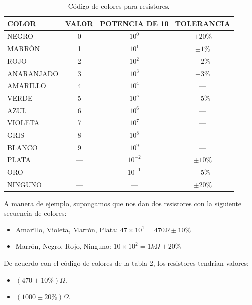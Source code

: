 \documentclass[12pt, a4paper]{article}
\begin{document}
\begin{table}[H]
    \centering
    \caption{Código de colores para resistores.}
    \begin{tabular}{|l|c|c|c|}
        \hline
        \textbf{COLOR} & \textbf{VALOR} & \textbf{POTENCIA DE 10} & \textbf{TOLERANCIA} \\
        \hline
        NEGRO & 0 & $10^0$ & $\pm 20\%$ \\
        \hline
        MARRÓN & 1 & $10^1$ & $\pm 1\%$ \\
        \hline
        ROJO & 2 & $10^2$ & $\pm 2\%$ \\
        \hline
        ANARANJADO & 3 & $10^3$ & $\pm 3\%$ \\
        \hline
        AMARILLO & 4 & $10^4$ & --- \\
        \hline
        VERDE & 5 & $10^5$ & $\pm 5\%$ \\
        \hline
        AZUL & 6 & $10^6$ & --- \\
        \hline
        VIOLETA & 7 & $10^7$ & --- \\
        \hline
        GRIS & 8 & $10^8$ & --- \\
        \hline
        BLANCO & 9 & $10^9$ & --- \\
        \hline
        PLATA & --- & $10^{-2}$ & $\pm 10\%$ \\
        \hline
        ORO & --- & $10^{-1}$ & $\pm 5\%$ \\
        \hline
        NINGUNO & --- & --- & $\pm 20\%$ \\
        \hline
    \end{tabular}
\end{table}

A manera de ejemplo, supongamos que nos dan dos resistores con la siguiente secuencia de colores:
\begin{itemize}
    \item[a.] Amarillo, Violeta, Marrón, Plata: $47 \times 10^1 = 470\Omega \pm 10\%$
    \item[b.] Marrón, Negro, Rojo, Ninguno: $10 \times 10^2 = 1k\Omega \pm 20\%$
\end{itemize}
De acuerdo con el código de colores de la tabla 2, los resistores tendrían valores:
\begin{itemize}
    \item[a.] $(470 \pm 10\%) \Omega$.
    \item[b.] $(1000 \pm 20\%) \Omega$.
\end{itemize}
\end{document}
